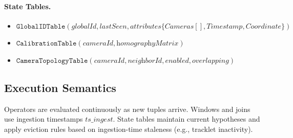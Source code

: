 \documentclass[11pt]{article}
\begin{document}
\paragraph{State Tables.}
\begin{itemize}[leftmargin=*]
    \item $\texttt{GlobalIDTable}(\textit{globalId}, \textit{lastSeen}, \textit{attributes}\{\textit{Cameras}[], \textit{Timestamp}, \textit{Coordinate}\})$
    \item $\texttt{CalibrationTable}(\textit{cameraId}, \textit{homographyMatrix})$
    \item $\texttt{CameraTopologyTable}(\textit{cameraId}, \textit{neighborId}, \textit{enabled}, \textit{overlapping})$
\end{itemize}

\subsection{Execution Semantics}
Operators are evaluated continuously as new tuples arrive. Windows and joins use ingestion timestamps $\textit{ts\_ingest}$. State tables maintain current hypotheses and apply eviction rules based on ingestion-time staleness (e.g., tracklet inactivity).
\end{document}
